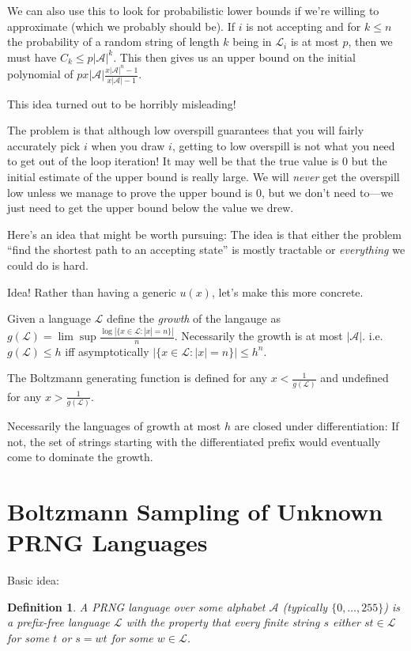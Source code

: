 \documentclass[a4paper]{book}
\newtheorem{definition}{Definition}[section]
\begin{document}
We can also use this to look for probabilistic lower bounds if we're willing to approximate (which we probably should be).
If \(i\) is not accepting and for \(k \leq n\) the probability of a random string of length \(k\) being in \(\mathcal{L}_i\) is at most \(p\),
then we must have \(C_k \leq p |\mathcal{A}|^k\).
This then gives us an upper bound on the initial polynomial of \(p x |\mathcal{A}| \frac{{x |\mathcal{A}|}^n - 1}{x |\mathcal{A}| - 1}\).

This idea turned out to be horribly misleading!

The problem is that although low overspill guarantees that you will fairly accurately pick \(i\) when you draw \(i\),
getting to low overspill is not what you need to get out of the loop iteration!
It may well be that the true value is \(0\) but the initial estimate of the upper bound is really large.
We will \emph{never} get the overspill low unless we manage to prove the upper bound is \(0\),
but we don't need to---we just need to get the upper bound below the value we drew.

Here's an idea that might be worth pursuing:
The idea is that either the problem ``find the shortest path to an accepting state'' is mostly tractable or \emph{everything} we could do is hard.

Idea! Rather than having a generic \(u(x)\),
let's make this more concrete.

Given a language \(\mathcal{L}\) define the \emph{growth} of the langauge as \(g(\mathcal{L}) = \lim\sup \frac{\log |\{x \in \mathcal{L}: |x| = n\}|}{n}\).
Necessarily the growth is at most \(|\mathcal{A}|\).
i.e. \(g(\mathcal{L}) \leq h\) iff asymptotically \(|\{x \in \mathcal{L}: |x| = n\}| \leq h^n\).

The Boltzmann generating function is defined for any \(x < \frac{1}{g(\mathcal{L})}\) and undefined for any \(x > \frac{1}{g(\mathcal{L})}\).

Necessarily the languages of growth at most \(h\) are closed under differentiation:
If not, the set of strings starting with the differentiated prefix would eventually come to dominate the growth.

\section{Boltzmann Sampling of Unknown PRNG Languages}

Basic idea:

\begin{definition}
A PRNG language over some alphabet \(\mathcal{A}\) (typically \(\{0, \ldots, 255\}\)) is a prefix-free language \(\mathcal{L}\) with the property that every finite string \(s\) either \(st \in \mathcal{L}\) for some \(t\) or \(s = wt\) for some \(w \in \mathcal{L}\).
\end{definition}
\end{document}
